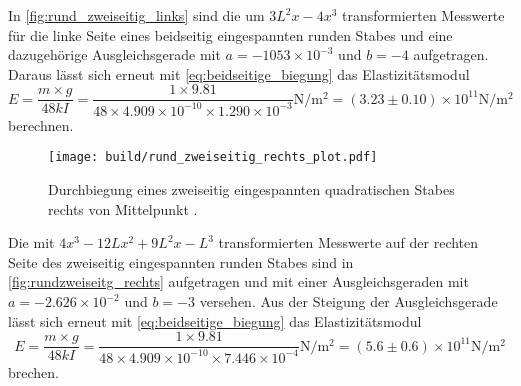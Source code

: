 \noindent In \autoref{fig:rund_zweiseitig_links} sind die um $3L^2x-4x^3$ transformierten Messwerte für die linke Seite eines beidseitig eingespannten runden Stabes und eine dazugehörige Ausgleichsgerade mit $a=-1053\times 10^{-3}$ und $b=-4$ aufgetragen.  Daraus lässt sich erneut mit \autoref{eq:beidseitige_biegung} das Elastizitätsmodul
\begin{equation*}
  E=\frac{m \times g}{48kI} = \frac{1 \times 9.81}{48 \times 4.909 \times 10^{-10} \times 1.290 \times 10^{-3}} \unit{\newton\per\meter\squared} = (3.23 \pm 0.10) \times 10^{11} \unit{\newton\per\meter\squared}
\end{equation*}
\noindent berechnen.

\begin{figure}[H]
  \centering
  \texttt{[image: build/rund\_zweiseitig\_rechts\_plot.pdf]}
  \caption{Durchbiegung eines zweiseitig eingespannten quadratischen Stabes rechts von Mittelpunkt \cite{V103}.}
  \label{fig:rund_zweiseitig_rechts}
\end{figure}

\noindent Die mit $4x^3-12Lx^2+9L^2x-L^3$ transformierten Messwerte auf der rechten Seite des zweiseitig eingespannten runden Stabes sind in \autoref{fig:rundzweiseitg_rechts} aufgetragen und mit einer Ausgleichsgeraden mit $a=-2.626\times 10^{-2}$ und $b=-3$ versehen.
\noindent Aus der Steigung der Ausgleichsgerade lässt sich erneut mit \autoref{eq:beidseitige_biegung} das Elastizitätsmodul
\begin{equation*}
  E=\frac{m \times g}{48kI} = \frac{1 \times 9.81}{48 \times 4.909 \times 10^{-10} \times 7.446 \times 10^{-4}} \unit{\newton\per\meter\squared} = (5.6 \pm 0.6) \times 10^{11} \unit{\newton\per\meter\squared}
\end{equation*}
\noindent brechen.